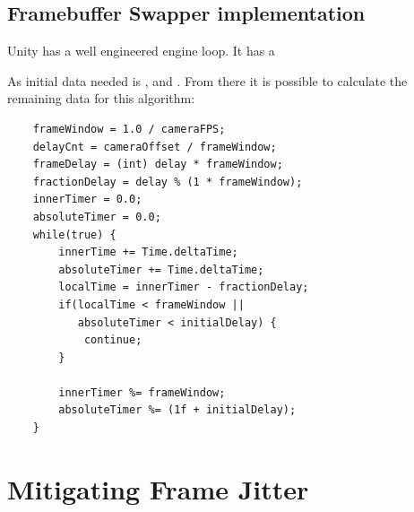 \subsection{Framebuffer Swapper implementation}

Unity has a well engineered engine loop. It has a

As initial data needed is ,  and 
. From there it is possible to calculate the remaining 
data for this algorithm:

\begin{lstlisting}
	frameWindow = 1.0 / cameraFPS;
	delayCnt = cameraOffset / frameWindow;
	frameDelay = (int) delay * frameWindow;
	fractionDelay = delay % (1 * frameWindow);
	innerTimer = 0.0;
	absoluteTimer = 0.0;
	while(true) {
		innerTime += Time.deltaTime;
		absoluteTimer += Time.deltaTime;
		localTime = innerTimer - fractionDelay;
		if(localTime < frameWindow ||
		   absoluteTimer < initialDelay) {
			continue;
		}
		
		innerTimer %= frameWindow;
		absoluteTimer %= (1f + initialDelay);
	}
\end{lstlisting}

\section{Mitigating Frame Jitter}